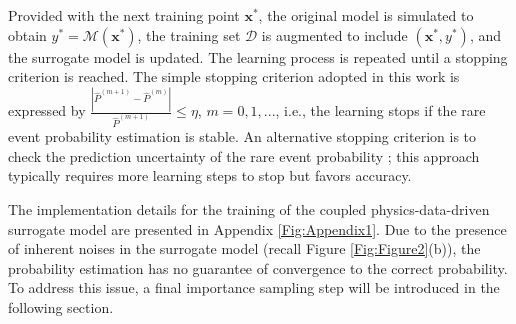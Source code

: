 \documentclass[number,preprint,3p]{elsarticle}
\newcommand{\1}[2]{\mathbb{I}_{#1}\left(#2\right)}
\newcommand{\vect}[1]{\boldsymbol{#1}}
\begin{document}
Provided with the next training point $\vect{x}^{\ast}$, the original model is simulated to obtain $y^{\ast}=\mathcal{M}(\vect{x}^{\ast})$, the training set $\mathcal{D}$ is augmented to include $(\vect{x}^{\ast},y^{\ast})$, and the surrogate model is updated. The learning process is repeated until a stopping criterion is reached. The simple stopping criterion adopted in this work is expressed by $\frac{\left | \hat{P}^{(m+1)}-\hat{P}^{(m)} \right |}{\hat{P}^{(m+1)}}\leqslant \eta$, $m=0,1,...$, i.e., the learning stops if the rare event probability estimation is stable. An alternative stopping criterion is to check the prediction uncertainty of the rare event probability \cite{dubourg2011reliability,moustapha2022active}; this approach typically requires more learning steps to stop but favors accuracy. 
	
	The implementation details for the training of the coupled physics-data-driven surrogate model are presented in Appendix \ref{Fig:Appendix1}. Due to the presence of inherent noises in the surrogate model  (recall Figure \ref{Fig:Figure2}(b)), the  probability estimation has no guarantee of convergence to the correct probability. To address this issue, a final importance sampling step will be introduced in the following section.
	
\end{document}
